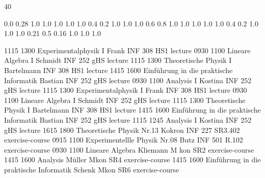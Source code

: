 \documentclass[a4paper,10pt]{report}
\begin{document}
\thispagestyle{empty}
\begin{landscape}
\noindent{}

\setslotsize{2.8cm}{0.3cm}
 {40}
\settextframe{0.8mm}

\seteventcornerradius{0pt}


			{0.0} 	{0.28}	{1.0} 	{1.0}	{1.0}	{1.0}
 	{1.0} 	{0.4} 	{0.2} 	{1.0}	{1.0}	{1.0}
   		{0.6} 	{0.8} 	{1.0} 	{1.0}	{1.0}	{1.0}
 		{1.0} 	{0.4} 	{0.2} 	{1.0}	{1.0}	{1.0}
       		{0.21}	{0.5} 	{0.16}	{1.0}	{1.0}	{1.0}

\begin{timetable}
   {1115} {1300} {Experimentalphysik I}                   	{Frank}         {INF 308 HS1}     	{lecture}
   {0930} {1100} {Lineare Algebra I}                      	{Schmidt}      	{INF 252 gHS} 		{lecture}
   {1115} {1300} {Theoretische Physik I}                  	{Bartelmann}    {INF 308 HS1}       {lecture}
   {1415} {1600} {Einführung in die praktische Informatik} 	{Bastian}      	{INF 252 gHS}    	{lecture}
   {0930} {1100} {Analysis I}     							{Kostina}     	{INF 252 gHS}     	{lecture}
   {1115} {1300} {Experimentalphysik I}           			{Frank}         {INF 308 HS1}    	{lecture}
   {0930} {1100} {Lineare Algebra I}                        {Schmidt}       {INF 252 gHS} 		{lecture}
   {1115} {1300} {Theoretische Physik I} 					{Bartelmann}   	{INF 308 HS1}    	{lecture}
   {1415} {1600} {Einführung in die praktische Informatik}  {Bastian}       {INF 252 gHS}    	{lecture}
   {1115} {1245} {Analysis I}      		   					{Kostina}       {INF 252 gHS}    	{lecture}
   {1615} {1800} {Theoretische Physik}						{Nr.13 Kokron}	{INF 227 SR3.402}	{exercise-course}
   {0915} {1100} {Experimentellle Physik}					{Nr.08 Butz}	{INF 501 R.102}		{exercise-course}
   {0930} {1100} {Lineare Algebra}							{Kliemann}		{M	kon SR2}	{exercise-course}
   {1415} {1600} {Analysis}									{Müller}		{Mkon SR4}	{exercise-course}
   {1415} {1600} {Einführung in die praktische Informatik}	{Schenk}		{Mkon SR6}	{exercise-course}
\end{timetable}
\end{landscape}
\end{document}
